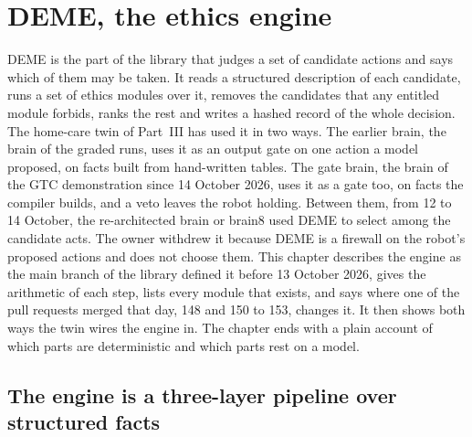 \chapter{DEME, the ethics engine}\label{ch:deme}

DEME is the part of the \erisml{} library that judges a set of candidate actions and says which
of them may be taken. It reads a structured description of each candidate, runs a set of ethics
modules over it, removes the candidates that any entitled module forbids, ranks the rest and
writes a hashed record of the whole decision. The home-care twin of Part~III has used it in two
ways. The earlier brain, the brain of the graded runs, uses it as an output gate on one action a
model proposed, on facts built from hand-written tables. The gate brain, the brain of the GTC
demonstration since 14 October 2026, uses it as a gate too, on facts the compiler builds, and a
veto leaves the robot holding. Between them, from 12 to 14 October, the re-architected brain or
brain8 used DEME to select among the candidate acts. The owner withdrew it because DEME is a
firewall on the robot's proposed actions and does not choose them. This chapter describes the engine as the main
branch of the library defined it before 13 October 2026, gives the arithmetic of each step, lists
every module that exists, and says where one of the pull requests merged that day, 148 and 150 to
153, changes it. It then shows both ways the twin wires
the engine in. The chapter ends with a plain account of which parts are deterministic and which
parts rest on a model.

\section{The engine is a three-layer pipeline over structured facts}\label{sec:deme-overview}

